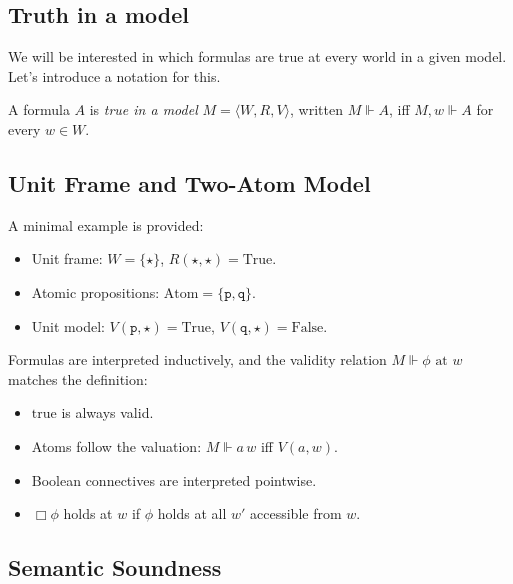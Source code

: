 \subsection{Truth in a model}

We will be interested in which formulas are true at every 
world in a given model. Let’s introduce a notation for this.

\begin{definition}
  \label{true-in-model}
  \leanok
  A formula $A$ is \emph{true in a model} 
$M = \langle W, R, V \rangle$, written $M \Vdash A$, iff 
$M, w \Vdash A$ for every $w \in W$.
\end{definition}

\subsection{Unit Frame and Two-Atom Model}

A minimal example is provided:
\begin{itemize}
  \item Unit frame: $W = \{\star\}$, $R(\star,\star) = \text{True}$.
  \item Atomic propositions: $\mathrm{Atom} = \{\texttt{p}, \texttt{q}\}$.
  \item Unit model: $V(\texttt{p},\star) = \text{True}$, $V(\texttt{q},\star) = \text{False}$.
\end{itemize}

Formulas are interpreted inductively, and the validity relation $M \Vdash \phi \text{ at } w$ matches the definition:

\begin{definition}
  \label{def:example}
  \leanok
\begin{itemize}
  \item $\text{true}$ is always valid.
  \item Atoms follow the valuation: $M \Vdash a\, w$ iff $V(a, w)$.
  \item Boolean connectives are interpreted pointwise.
  \item $\Box \phi$ holds at $w$ if $\phi$ holds at all $w'$ accessible from $w$.
\end{itemize}
\end{definition}

\subsection{Semantic Soundness}

